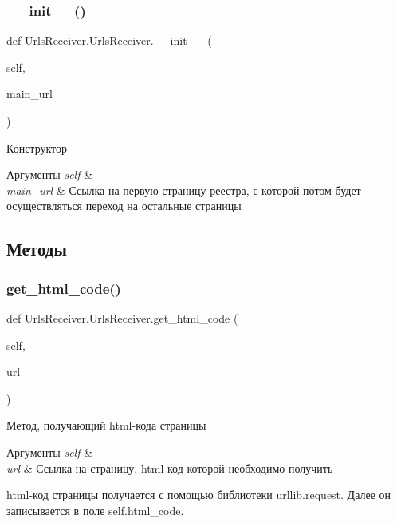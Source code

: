 \subsubsection{\texorpdfstring{\+\_\+\+\_\+init\+\_\+\+\_\+()}{\_\_init\_\_()}}
{\footnotesize\ttfamily def Urls\+Receiver.\+Urls\+Receiver.\+\_\+\+\_\+init\+\_\+\+\_\+ (\begin{DoxyParamCaption}\item[{}]{self,  }\item[{}]{main\+\_\+url }\end{DoxyParamCaption})}



Конструктор 


\begin{DoxyParams}{Аргументы}
{\em self} & \\
\hline
{\em main\+\_\+url} & Ссылка на первую страницу реестра, с которой потом будет осуществляться переход на остальные страницы \\
\hline
\end{DoxyParams}


\subsection{Методы}
\mbox{\label{classUrlsReceiver_1_1UrlsReceiver_a448316919bfe59e35942edc34f2b674b}} 
\subsubsection{\texorpdfstring{get\+\_\+html\+\_\+code()}{get\_html\_code()}}
{\footnotesize\ttfamily def Urls\+Receiver.\+Urls\+Receiver.\+get\+\_\+html\+\_\+code (\begin{DoxyParamCaption}\item[{}]{self,  }\item[{}]{url }\end{DoxyParamCaption})}



Метод, получающий html-\/кода страницы 


\begin{DoxyParams}{Аргументы}
{\em self} & \\
\hline
{\em url} & Ссылка на страницу, html-\/код которой необходимо получить\\
\hline
\end{DoxyParams}
html-\/код страницы получается с помощью библиотеки {\ttfamily urllib.\+request}. Далее он записывается в поле {\ttfamily self.\+html\+\_\+code}. \mbox{\label{classUrlsReceiver_1_1UrlsReceiver_a871a6b2bc7d65cd8ea6184061f994592}} 
